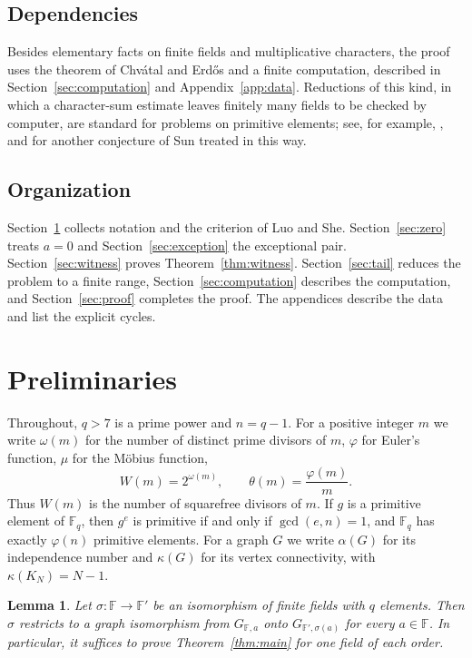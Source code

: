 \documentclass{amsart}
\newtheorem{lemma}[theorem]{Lemma}
\theoremstyle{remark}
\numberwithin{equation}{section}
\numberwithin{table}{section}
\newcommand{\F}{\mathbb{F}}
\begin{document}
\subsection*{Dependencies}
Besides elementary facts on finite fields and multiplicative characters, the proof uses the theorem of Chv\'atal and Erd\H{o}s and a finite computation, described in Section~\ref{sec:computation} and Appendix~\ref{app:data}. Reductions of this kind, in which a character-sum estimate leaves finitely many fields to be checked by computer, are standard for problems on primitive elements; see, for example, \cite{COT}, and \cite{WS} for another conjecture of Sun treated in this way.

\subsection*{Organization}
Section~\ref{sec:prelim} collects notation and the criterion of Luo and She. Section~\ref{sec:zero} treats $a=0$ and Section~\ref{sec:exception} the exceptional pair. Section~\ref{sec:witness} proves Theorem~\ref{thm:witness}. Section~\ref{sec:tail} reduces the problem to a finite range, Section~\ref{sec:computation} describes the computation, and Section~\ref{sec:proof} completes the proof. The appendices describe the data and list the explicit cycles.

\section{Preliminaries}\label{sec:prelim}

Throughout, $q>7$ is a prime power and $n=q-1$. For a positive integer $m$ we write $\omega(m)$ for the number of distinct prime divisors of $m$, $\varphi$ for Euler's function, $\mu$ for the M\"obius function,
\[
W(m)=2^{\omega(m)},\qquad \theta(m)=\frac{\varphi(m)}{m}.
\]
Thus $W(m)$ is the number of squarefree divisors of $m$. If $g$ is a primitive element of $\F_q$, then $g^{e}$ is primitive if and only if $\gcd(e,n)=1$, and $\F_q$ has exactly $\varphi(n)$ primitive elements. For a graph $G$ we write $\alpha(G)$ for its independence number and $\kappa(G)$ for its vertex connectivity, with $\kappa(K_N)=N-1$.

\begin{lemma}\label{lem:iso}
Let $\sigma\colon \F\to\F'$ be an isomorphism of finite fields with $q$ elements. Then $\sigma$ restricts to a graph isomorphism from $G_{\F,a}$ onto $G_{\F',\sigma(a)}$ for every $a\in\F$. In particular, it suffices to prove Theorem~\ref{thm:main} for one field of each order.
\end{lemma}
\end{document}
